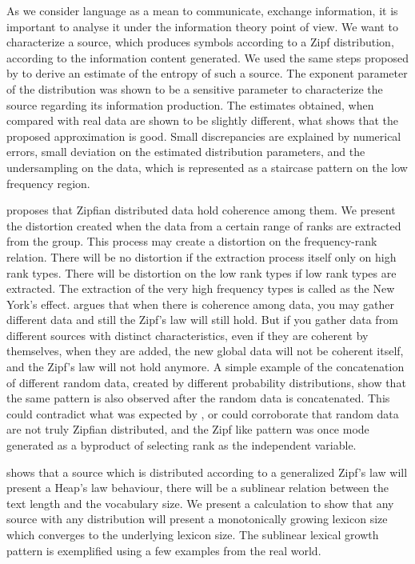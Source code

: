 As we consider language as a mean to communicate, exchange information, it is important
to analyse it under the information theory point of view. We want to characterize a source, 
which produces symbols according to a Zipf distribution, according to the information
content generated. We used the same steps proposed by \cite{grignetti} to derive an estimate
of the entropy of such a source. The exponent parameter of the distribution was shown
to be a sensitive parameter to characterize the source regarding its information production.
The estimates obtained, when compared with real data are shown to be slightly different,
what shows that the proposed approximation is good.
Small discrepancies are explained by numerical errors, small deviation on the
estimated distribution parameters, and the undersampling on the data, which is
represented as a staircase pattern on the low frequency region.

\cite{cristelli2012} proposes that Zipfian distributed data hold coherence among them.
We present the distortion created when the data from a certain range of ranks are 
extracted from the group. This process may create a distortion on the frequency-rank
relation. There will be no distortion if the extraction process itself only on high
rank types. There will be distortion on the low rank types if low rank types are
extracted. The extraction of the very high frequency types is called 
as the New York's effect. \cite{cristelli2012} argues that when there is coherence
among data, you may gather different data and still the Zipf's law will still hold.
But if you gather data from different sources with distinct characteristics,
even if they are coherent by themselves, when they are added, the new global data 
will not be coherent itself, and the Zipf's law will not hold anymore.
A simple example of the concatenation of different random data, created by 
different probability distributions, show that the same pattern is also observed
after the random data is concatenated. This could contradict what was expected 
by \cite{cristelli2012}, or could corroborate that random data are not truly Zipfian
distributed, and the Zipf like pattern was once mode generated as a byproduct of
selecting rank as the independent variable.

\cite{vanLeijenhorst} shows that a source which is distributed according to a 
generalized Zipf's law will present a Heap's law behaviour, there will be a 
sublinear relation between the text length and the vocabulary size.
We present a calculation to show that any source with any distribution will
present a monotonically growing lexicon size which converges to the 
underlying lexicon size. The sublinear lexical growth pattern is exemplified 
using a few examples from the real world.


